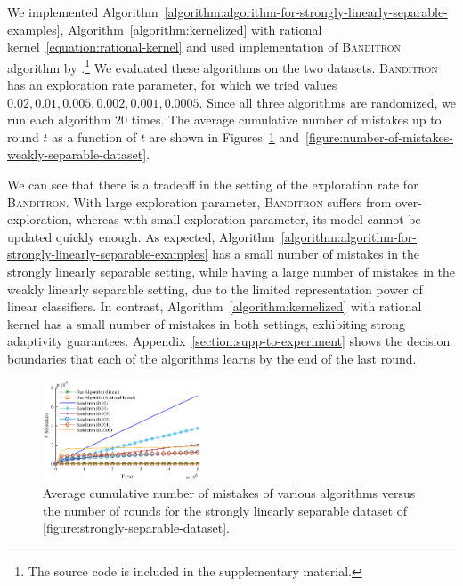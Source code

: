 We implemented
Algorithm~\ref{algorithm:algorithm-for-strongly-linearly-separable-examples},
Algorithm~\ref{algorithm:kernelized} with rational
kernel~\eqref{equation:rational-kernel} and used implementation of
\textsc{Banditron} algorithm by \citet{Orabona09}.\footnote{The source code
is included in the supplementary material.}
We evaluated these algorithms on the two datasets. \textsc{Banditron} has an
exploration rate parameter, for which we tried values $0.02, 0.01, 0.005, 0.002,
0.001, 0.0005$. Since all three algorithms are randomized, we run each algorithm
$20$ times. The average cumulative number of mistakes up to round $t$ as a
function of $t$ are shown in
Figures~\ref{figure:number-of-mistakes-strongly-separable-dataset}
and~\ref{figure:number-of-mistakes-weakly-separable-dataset}.

We can see that there is a tradeoff in the setting of the exploration rate for
\textsc{Banditron}. With large exploration parameter, \textsc{Banditron} suffers
from over-exploration, whereas with small exploration parameter, its model
cannot be updated quickly enough. As expected,
Algorithm~\ref{algorithm:algorithm-for-strongly-linearly-separable-examples} has
a small number of mistakes in the strongly linearly separable setting, while
having a large number of mistakes in the weakly linearly separable setting, due
to the limited representation power of linear classifiers. In contrast,
Algorithm~\ref{algorithm:kernelized} with rational kernel has a small number of
mistakes in both settings, exhibiting strong adaptivity guarantees.
Appendix~\ref{section:supp-to-experiment} shows the decision boundaries that
each of the algorithms learns by the end of the last round.

\begin{figure}
\centering
\includegraphics[width=0.42\textwidth]{figures/strong3}
\caption{Average cumulative number of mistakes of various algorithms versus the
number of rounds for the strongly linearly separable dataset of
\autoref{figure:strongly-separable-dataset}.}
\label{figure:number-of-mistakes-strongly-separable-dataset}
\end{figure}


